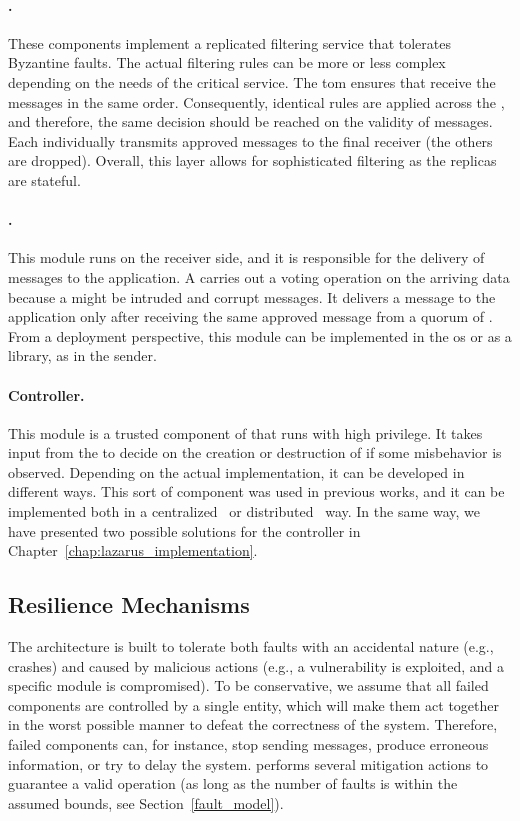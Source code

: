 \paragraph{\Repsieve.}
These components implement a replicated filtering service that tolerates Byzantine faults. 
The actual filtering rules can be more or less complex depending on the needs of the critical service. 
The \gls{tom} ensures that \repsieves receive the messages in the same order. 
Consequently, identical rules are applied across the \repsieves, and therefore, the same decision should be reached on the validity of messages. 
Each \repsieve individually transmits approved messages to the final receiver (the others are dropped). 
Overall, this layer allows for sophisticated filtering as the replicas are stateful.

\paragraph{\Postsieve.} This module runs on the receiver side, and it is responsible for the delivery of messages to the application.
A \postsieve carries out a voting operation on the arriving data because a \repsieve might be intruded and corrupt messages.
It delivers a message to the application only after receiving the same approved message from a quorum of \repsieves.
From a deployment perspective, this module can be implemented in the \gls{os} or as a library, as in the sender.

\paragraph{Controller.} This module is a trusted component of \sieveq that runs with high privilege.
It takes input from the \repsieves to decide on the creation or destruction of \presieves if some misbehavior is observed.
Depending on the actual \sieveq implementation, it can be developed in different ways.
This sort of component was used in previous works, and it can be implemented both in a centralized~\cite{Roeder:2010,Platania:2014} or distributed~\cite{Sousa:2010} way.
In the same way, we have presented two possible solutions for the \system controller in Chapter~\ref{chap:lazarus_implementation}.


\subsection{Resilience Mechanisms}

The \sieveq architecture is built to tolerate both faults with an accidental nature (e.g., crashes) and caused by malicious actions (e.g., a vulnerability is exploited, and a specific module is compromised).
To be conservative, we assume that all failed components are controlled by a single entity, which will make them act together in the worst possible manner to defeat the correctness of the system. 
Therefore, failed components can, for instance, stop sending messages, produce erroneous information, or try to delay the system. 
\sieveq performs several mitigation actions to guarantee a valid operation (as long as the number of faults is within the assumed bounds, see Section~\ref{fault_model}).

